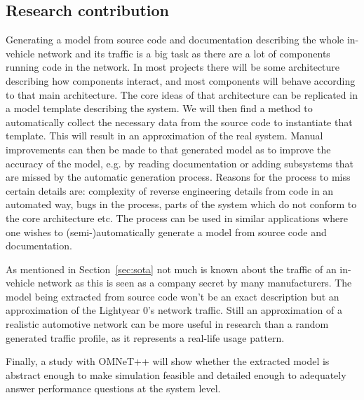 \subsection{Research contribution}
\label{sec:research_contribution}
Generating a model from source code and documentation describing the whole in-vehicle network and its traffic is a big task as there are a lot of components running code in the network. In most projects there will be some architecture describing how components interact, and most components will behave according to that main architecture. The core ideas of that architecture can be replicated in a model template describing the system. We will then find a method to automatically collect the necessary data from the source code to instantiate that template. This will result in an approximation of the real system. Manual improvements can then be made to that generated model as to improve the accuracy of the model, e.g. by reading documentation or adding subsystems that are missed by the automatic generation process. Reasons for the process to miss certain details are: complexity of reverse engineering details from code in an automated way, bugs in the process, parts of the system which do not conform to the core architecture etc. The process can be used in similar applications where one wishes to (semi-)automatically generate a model from source code and documentation.

As mentioned in Section~\ref{sec:sota} not much is known about the traffic of an in-vehicle network as this is seen as a company secret by many manufacturers. The model being extracted from source code won't be an exact description but an approximation of the Lightyear 0's network traffic. Still an approximation of a realistic automotive network can be more useful in research than a random generated traffic profile, as it represents a real-life usage pattern. 

Finally, a study with OMNeT++ will show whether the extracted model is abstract enough to make simulation feasible and detailed enough to adequately answer performance questions at the system level.

